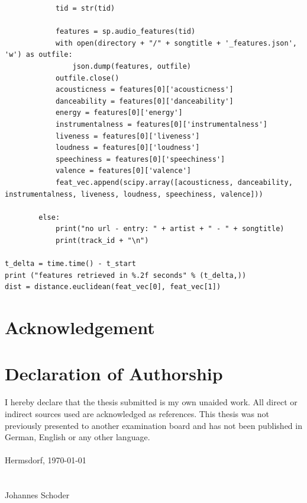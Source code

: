 \documentclass[a4paper,oneside,12pt]{report}
\begin{document}
\begin{lstlisting}
			tid = str(tid)

			features = sp.audio_features(tid)
			with open(directory + "/" + songtitle + '_features.json', 'w') as outfile:
				json.dump(features, outfile)
			outfile.close()    
			acousticness = features[0]['acousticness']
			danceability = features[0]['danceability']
			energy = features[0]['energy']
			instrumentalness = features[0]['instrumentalness']
			liveness = features[0]['liveness']
			loudness = features[0]['loudness']
			speechiness = features[0]['speechiness']
			valence = features[0]['valence']
			feat_vec.append(scipy.array([acousticness, danceability, instrumentalness, liveness, loudness, speechiness, valence]))	

		else: 
			print("no url - entry: " + artist + " - " + songtitle)
			print(track_id + "\n")
			
t_delta = time.time() - t_start
print ("features retrieved in %.2f seconds" % (t_delta,))   
dist = distance.euclidean(feat_vec[0], feat_vec[1])
\end{lstlisting}


\chapter*{Acknowledgement}

\chapter*{Declaration of Authorship}

I hereby declare that the thesis submitted is my own unaided work. All direct or indirect
sources used are acknowledged as references.
This thesis was not previously presented to another examination board and has not been
published in German, English or any other language.\\
\ \\
Hermsdorf, \today
\ \\
\ \\
\ \\
Johannes Schoder
\end{document}
